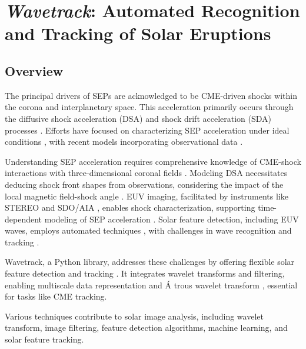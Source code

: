 
\section{\textit{Wavetrack}: Automated Recognition and Tracking of Solar Eruptions}

\subsection{Overview}
The principal drivers of SEPs are acknowledged to be CME-driven shocks within the corona and interplanetary space. This acceleration primarily occurs through the diffusive shock acceleration (DSA) and shock drift acceleration (SDA) processes \citep{reames_2021}. Efforts have focused on characterizing SEP acceleration under ideal conditions \citep{vainio_2008, sokolov_2009, kozarev_2013}, with recent models incorporating observational data \citep{vourlidas_2012, kwon_2014, kozarev_2015, kozarev_2019}.

Understanding SEP acceleration requires comprehensive knowledge of CME-shock interactions with three-dimensional coronal fields \citep{rouillard_2016}. Modeling DSA necessitates deducing shock front shapes from observations, considering the impact of the local magnetic field-shock angle \citep{guo_2013}. EUV imaging, facilitated by instruments like STEREO \citep{wuelser_2004} and SDO/AIA \citep{lemen_2012}, enables shock characterization, supporting time-dependent modeling of SEP acceleration \citep{kozarev_2016, kozarev_2017, kozarev_2019}. Solar feature detection, including EUV waves, employs automated techniques \citep{aschwanden_2010, perez_Suarez_2011}, with challenges in wave recognition and tracking \citep{podladchikova_2005, verbeeck_2014, long_2014, ireland_2019}.

Wavetrack, a Python library, addresses these challenges by offering flexible solar feature detection and tracking \citep{stepanyuk_2022}. It integrates wavelet transforms and filtering, enabling multiscale data representation  \citep{starck_2002} and \'A trous wavelet transform \citep{akansu_1991, holschneider_1989}, essential for tasks like CME tracking.

Various techniques contribute to solar image analysis, including wavelet transform, image filtering, feature detection algorithms, machine learning, and solar feature tracking.

